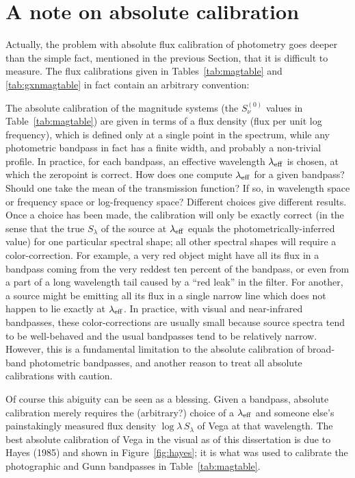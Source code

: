 \section{A note on absolute calibration}
\label{sec:hayes}

Actually, the problem with absolute flux calibration of photometry
goes deeper than the simple fact, mentioned in the previous Section,
that it is difficult to measure.  The flux calibrations given in
Tables~\ref{tab:magtable} and \ref{tab:gxnmagtable} in fact contain an
arbitrary convention:

The absolute calibration of the magnitude systems (the $S_{\nu}^{(0)}$
values in Table~\ref{tab:magtable}) are given in terms of a flux
density (flux per unit log frequency), which is defined only at a
single point in the spectrum, while any photometric bandpass in fact
has a finite width, and probably a non-trivial profile.  In practice,
for each bandpass, an effective wavelength $\lambda_{\rm eff}$ is
chosen, at which the zeropoint is correct.  How does one compute
$\lambda_{\rm eff}$ for a given bandpass?  Should one take the mean of
the transmission function?  If so, in wavelength space or frequency
space or log-frequency space?  Different choices give different
results.  Once a choice has been made, the calibration will only be
exactly correct (in the sense that the true $S_{\lambda}$ of the
source at $\lambda_{\rm eff}$ equals the photometrically-inferred
value) for one particular spectral shape; all other spectral shapes
will require a color-correction.  For example, a very red object might
have all its flux in a bandpass coming from the very reddest ten
percent of the bandpass, or even from a part of a long wavelength tail
caused by a ``red leak'' in the filter.  For another, a source might
be emitting all its flux in a single narrow line which does not happen
to lie exactly at $\lambda_{\rm eff}$.  In practice, with visual and
near-infrared bandpasses, these color-corrections are usually small
because source spectra tend to be well-behaved and the usual
bandpasses tend to be relatively narrow.  However, this is a
fundamental limitation to the absolute calibration of broad-band
photometric bandpasses, and another reason to treat all absolute
calibrations with caution.

Of course this abiguity can be seen as a blessing.  Given a bandpass,
absolute calibration merely requires the (arbitrary?) choice of a
$\lambda_{\rm eff}$ and someone else's painstakingly measured flux
density $\log\lambda\,S_{\lambda}$ of Vega at that wavelength.  The
best absolute calibration of Vega in the visual as of this
dissertation is due to Hayes (1985) and shown in
Figure~\ref{fig:hayes}; it is what was used to calibrate the
photographic and Gunn bandpasses in Table~\ref{tab:magtable}.


